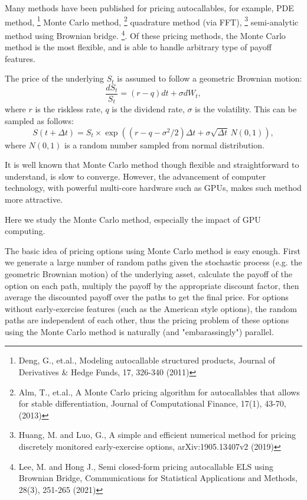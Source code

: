 Many methods have been published for pricing autocallables, for example, 
PDE method,
\footnote{Deng, G., et.al., Modeling autocallable structured products,
          Journal of Derivatives \& Hedge Funds, 17, 326-340 (2011)}
Monte Carlo method,
\footnote{Alm, T., et.al., A Monte Carlo pricing algorithm for autocallables
          that allows for stable differentiation, Journal of Computational
          Finance, 17(1), 43-70, (2013)}
quadrature method (via FFT),
\footnote{Huang, M. and Luo, G., A simple and efficient numerical method for
          pricing discretely monitored early-exercise options,
          arXiv:1905.13407v2 (2019)}
semi-analytic method using Brownian bridge.
\footnote{Lee, M. and Hong J., Semi closed-form pricing autocallable ELS using
          Brownian Bridge, Communications for Statistical Applications and
          Methods, 28(3), 251-265 (2021)}.
Of these pricing methods, the Monte Carlo method is the most flexible, and is
able to handle arbitrary type of payoff features.

The price of the underlying $S_t$ is assumed to follow a geometric Brownian 
motion:
\begin{equation}
  \frac{dS_t}{S_t} = (r-q)dt + \sigma dW_t,
\end{equation}
where $r$ is the riskless rate, $q$ is the dividend rate, $\sigma$ is the
volatility.
This can be sampled as follows:
\begin{equation}
  S(t+\Delta t) = S_t \times 
      \exp\left( 
        (r-q-\sigma^2/2)\Delta t + \sigma\sqrt{\Delta t}\, N(0,1)
          \right),
\end{equation}
where $N(0,1)$ is a random number sampled from normal distribution.


It is well known that Monte Carlo method though flexible and straightforward to
understand, is slow to converge. However, the advancement of computer
technology, with powerful multi-core hardware such as GPUs, makes such method
more attractive.

Here we study the Monte Carlo method, especially the impact of GPU computing.

The basic idea of pricing options using Monte Carlo method is easy enough.
First we generate a large number of random paths given the stochastic
process (e.g. the geometric Brownian motion) of the underlying asset, calculate
the payoff of the option on each path, multiply the payoff by the appropriate
discount factor, then average the discounted payoff over the paths to
get the final price. For options without early-exercise features (such as the
American style options), the random paths are independent of each other, thus
the pricing problem of these options using the Monte Carlo method is naturally
(and "embarassingly") parallel.

